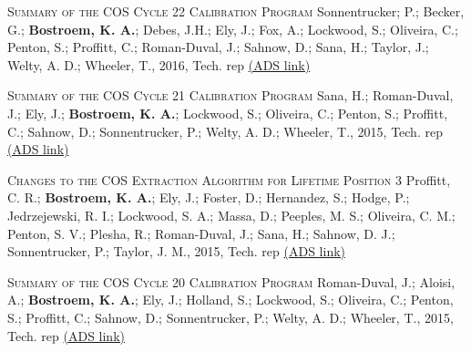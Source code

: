 \vspace{-0.1in}   
\begin{revnumerate}[24]
\item{\textsc{Summary of the COS Cycle 22 Calibration Program}  
Sonnentrucker; P.; Becker, G.; {\bf Bostroem, K. A.}; Debes, J.H.; Ely, J.; Fox, A.; Lockwood, S.; Oliveira, C.; Penton, S.; Proffitt, C.; Roman-Duval, J.; Sahnow, D.; Sana, H.; Taylor, J.; Welty, A. D.; Wheeler, T., 2016, Tech. rep 
\color{blue}\href{https://ui.adsabs.harvard.edu/#abs/2016cos..rept....3S/abstract}{(ADS link)}\color{black}}\\ %
\item{\textsc{Summary of the COS Cycle 21 Calibration Program}
Sana, H.; Roman-Duval, J.; Ely, J.; {\bf Bostroem, K. A.}; Lockwood, S.; Oliveira, C.; Penton, S.; Proffitt, C.; Sahnow, D.; Sonnentrucker, P.; Welty, A. D.; Wheeler, T., 2015, Tech. rep 
\color{blue}\href{https://ui.adsabs.harvard.edu/#abs/2015cos..rept....6S/abstract}{(ADS link)}\color{black}}\\ %

\item{\textsc{Changes to the COS Extraction Algorithm for Lifetime Position 3}
Proffitt, C. R.; {\bf Bostroem, K. A.}; Ely, J.; Foster, D.; Hernandez, S.; Hodge, P.; Jedrzejewski, R. I.; Lockwood, S. A.; Massa, D.; Peeples, M. S.; Oliveira, C. M.; Penton, S. V.; Plesha, R.; Roman-Duval, J.; Sana, H.; Sahnow, D. J.; Sonnentrucker, P.; Taylor, J. M.,  2015, Tech. rep 
\color{blue}\href{https://ui.adsabs.harvard.edu/#abs/2015cos..rept....3P/abstract}{(ADS link)}\color{black}}\\ %

\item{\textsc{Summary of the COS Cycle 20 Calibration Program} 
Roman-Duval, J.; Aloisi, A.; {\bf Bostroem, K. A.}; Ely, J.; Holland, S.; Lockwood, S.; Oliveira, C.; Penton, S.; Proffitt, C.; Sahnow, D.; Sonnentrucker, P.; Welty, A. D.; Wheeler, T., 2015, Tech. rep 
\color{blue}\href{https://ui.adsabs.harvard.edu/#abs/2015cos..rept....2R/abstract}{(ADS link)}\color{black}}\\ %


\end{revnumerate}
